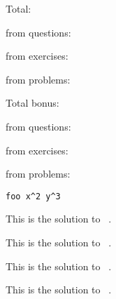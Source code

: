 \documentclass{article}
\begin{document}
Total: \printtotalpoints \par
from questions:  \par
from exercises:  \par
from problems:  \par \bigskip

Total bonus: \printtotalbonus \par
from questions:  \par
from exercises:  \par
from problems:  \par


\begin{question}[points=4,bonus-points=1,topic=geometry,tags={geometry,triangles},grade=7]
  \lipsum[1]
\begin{verbatim}
foo x^2 y^3
\end{verbatim}
\end{question}
\begin{solution}[print]
  This is the solution to \ExerciseType\ .
\end{solution}


\begin{question}[subtitle=Foo,points=5,topic=analysis,tags={analysis,functions},grade=11]
  \lipsum[2]
\end{question}
\begin{solution}
  This is the solution to \ExerciseType\ .
\end{solution}


\begin{problem}
  \lipsum[3]
\end{problem}
\begin{answer}
  This is the solution to \ExerciseType\ .
\end{answer}


\begin{exercise}
  \lipsum[4]
\end{exercise}
\begin{hint}
  This is the solution to \ExerciseType\ .
\end{hint}
\end{document}
